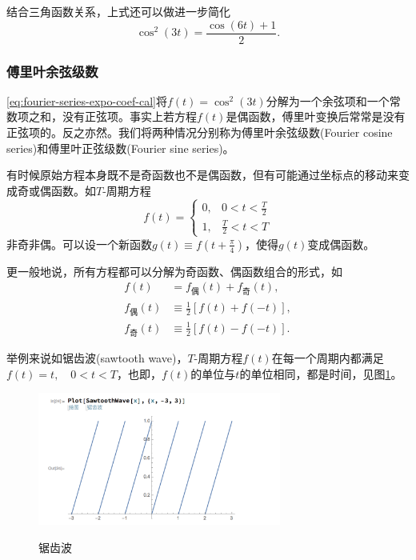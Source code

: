 结合三角函数关系，上式还可以做进一步简化
\begin{equation*}
  \cos^{2} \left(3 t \right) = \frac{\cos \left( 6 t \right) + 1}{2}.
\end{equation*}

\subsubsection{傅里叶余弦级数}
\label{sec:fourier-series-sin-coef}

\eqref{eq:fourier-series-expo-coef-cal}将$f(t) = \cos^{2} \left( 3t \right)$分解为一个余弦项和一个常数项之和，没有正弦项。事实上若方程$f(t)$是偶函数，傅里叶变换后常常是没有正弦项的。反之亦然。我们将两种情况分别称为傅里叶余弦级数(Fourier cosine series)和傅里叶正弦级数(Fourier sine series)。

有时候原始方程本身既不是奇函数也不是偶函数，但有可能通过坐标点的移动来变成奇或偶函数。如$T$-周期方程
\begin{equation*}
  f(t) = \begin{cases}
  0, & 0 < t < \frac{T}{2}\\
  1, & \frac{T}{2} < t < T
  \end{cases}
\end{equation*}
非奇非偶。可以设一个新函数$g(t) \equiv f \left( t + \frac{\pi}{4} \right)$，使得$g(t)$变成偶函数。

更一般地说，所有方程都可以分解为奇函数、偶函数组合的形式，如
\begin{equation*}
  \begin{split}
    f(t) & = f_{\text{偶}}(t) + f_{\text{奇}}(t), \\
    f_{\text{偶}}(t) & \equiv \frac{1}{2} \left[ f(t) + f(-t) \right], \\
    f_{\text{奇}}(t) & \equiv \frac{1}{2} \left[ f(t) - f(-t) \right].
  \end{split}
\end{equation*}

举例来说如锯齿波(sawtooth wave)，$T$-周期方程$f(t)$在每一个周期内都满足$f(t) = t, \quad 0 < t < T$，也即，$f(t)$的单位与$t$的单位相同，都是时间，见图\ref{fig:fourier-series-sawwave}。
\begin{figure}[htbp]
   \caption{锯齿波}
  \centering
  \includegraphics[width=8cm]{./Figures/20180305-sawtooth-wave.png}
  \label{fig:fourier-series-sawwave}
%
\end{figure}

